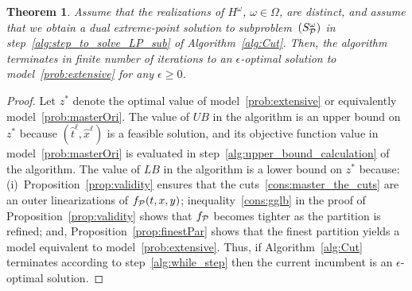 \documentclass[11pt]{article}
\newtheorem{theorem}{Theorem}
\newcommand{\cP}{{\cal P}}
\begin{document}
	\begin{theorem} \label{thm:converge}
		Assume that the realizations of $H^\omega$, $\omega \in \Omega$, are distinct, and assume that we obtain a dual extreme-point solution to subproblem~\((S_{\cP}^\omega)\) in step~\ref{alg:step_to_solve_LP_sub} of Algorithm~\ref{alg:Cut}. Then, the algorithm terminates in finite number of iterations to an $\epsilon$-optimal solution to model~\eqref{prob:extensive} for any \(\epsilon \ge 0\). 
	\end{theorem}
	\begin{proof}
		Let $z^*$ denote the optimal value of model~\eqref{prob:extensive} or equivalently model~\eqref{prob:masterOri}. The value of $UB$ in the algorithm is an upper bound on $z^*$ because $(\hat{t}^\ell,\hat{x}^\ell)$ is a feasible solution, and its objective function value in model~\eqref{prob:masterOri} is evaluated in step~\ref{alg:upper_bound_calculation} of the algorithm. The value of $LB$ in the algorithm is a lower bound on $z^*$ because: (i)~Proposition~\ref{prop:validity} ensures that the cuts~\eqref{cons:master_the_cuts} are an outer linearizations of $f_{\cP}(t,x,y)$; inequality~\eqref{cons:gglb} in the proof of Proposition~\ref{prop:validity} shows that $f_{\cP}$ becomes tighter as the partition is refined; and, Proposition~\ref{prop:finestPar} shows that the finest partition yields a model equivalent to  model~\eqref{prob:extensive}. Thus, if Algorithm~\ref{alg:Cut} terminates according to step~\ref{alg:while_step} then the current incumbent is an $\epsilon$-optimal solution.      
		

\end{proof}
\end{document}
